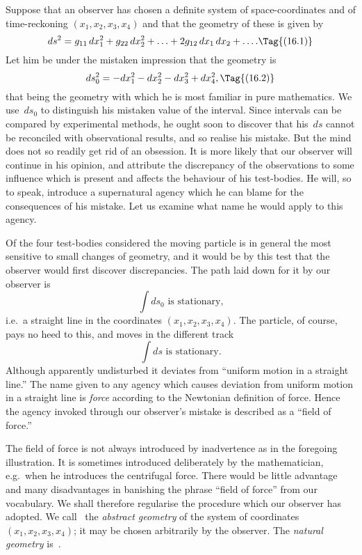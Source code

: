 \documentclass[12pt]{book}
\begin{document}
%

Suppose that an observer has chosen a definite system of space\hyp{}coordinates
and of time\hyp{}reckoning $(x_1, x_2, x_3, x_4)$ and that the geometry of these is given by
\[
ds^2 = g_{11}\, dx_1^2 + g_{22}\, dx_2^2 + \ldots + 2g_{12}\, dx_1\, dx_2 + \ldots.
\Tag{(16.1)}
\]
Let him be under the mistaken impression that the geometry is
\[
ds_0^2 = -dx_1^2 - dx_2^2 - dx_3^2 + dx_4^2,
\Tag{(16.2)}
\]
that being the geometry with which he is most familiar in pure mathematics.
We use~$ds_{0}$ to distinguish his mistaken value of the interval. Since intervals
can be compared by experimental methods, he ought soon to discover that his~$ds$
cannot be reconciled with observational results, and so realise his mistake.
But the mind does not so readily get rid of an obsession. It is more likely
that our observer will continue in his opinion, and attribute the discrepancy
of the observations to some influence which is present and affects the behaviour
of his test\hyp{}bodies. He will, so to speak, introduce a supernatural agency
which he can blame for the consequences of his mistake. Let us examine
what name he would apply to this agency.

Of the four test\hyp{}bodies considered the moving particle is in general the
most sensitive to small changes of geometry, and it would be by this test that
the observer would first discover discrepancies. The path laid down for it by
our observer is
\[
\int ds_0 \text{ is stationary,}
\]
i.e.\ a straight line in the coordinates $(x_1, x_2, x_3, x_4)$. The particle, of course,
pays no heed to this, and moves in the different track
\[
\int ds \text{ is stationary.}
\]
Although apparently undisturbed it deviates from ``uniform motion in a
straight line.'' The name given to any agency which causes deviation from
uniform motion in a straight line is \emph{force} according to the Newtonian definition
of force. Hence the agency invoked through our observer's mistake is described
as a ``field of force.''

The field of force is not always introduced by inadvertence as in the foregoing
illustration. It is sometimes introduced deliberately by the mathematician,
e.g.\ when he introduces the centrifugal force. There would be little
%
advantage and many disadvantages in banishing the phrase ``field of force''
from our vocabulary. We shall therefore regularise the procedure which our
observer has adopted. We call~ the \emph{abstract geometry} of the system of
coordinates $(x_1, x_2, x_3, x_4)$; it may be chosen arbitrarily by the observer. The
%
\emph{natural geometry} is~.
\end{document}
